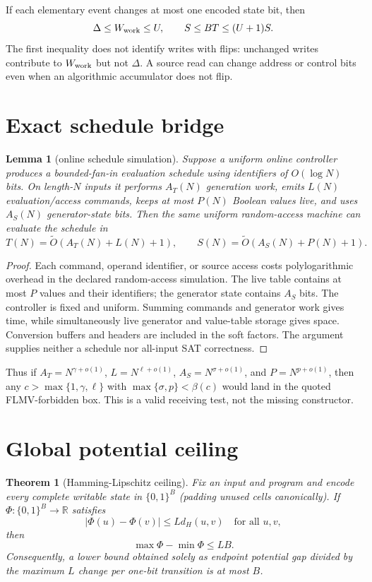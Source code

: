 \documentclass[11pt]{article}
\newtheorem{theorem}{Theorem}
\newtheorem{lemma}{Lemma}
\newcommand{\bits}{\{0,1\}}
\begin{document}
If each elementary event changes at most one encoded state bit, then
\[
 \Delta\le W_{\rm work}\le U,
 \qquad S\le BT\le(U+1)S.
\]
The first inequality does not identify writes with flips: unchanged writes contribute to $W_{\rm work}$ but not $\Delta$.  A source read can change address or control bits even when an algorithmic accumulator does not flip.

\section{Exact schedule bridge}

\begin{lemma}[online schedule simulation]
Suppose a uniform online controller produces a bounded-fan-in evaluation schedule using identifiers of $O(\log N)$ bits.  On length-$N$ inputs it performs $A_T(N)$ generation work, emits $L(N)$ evaluation/access commands, keeps at most $P(N)$ Boolean values live, and uses $A_S(N)$ generator-state bits.  Then the same uniform random-access machine can evaluate the schedule in
\[
 T(N)=\widetilde O(A_T(N)+L(N)+1),\qquad
 S(N)=\widetilde O(A_S(N)+P(N)+1).
\]
\end{lemma}

\begin{proof}
Each command, operand identifier, or source access costs polylogarithmic overhead in the declared random-access simulation.  The live table contains at most $P$ values and their identifiers; the generator state contains $A_S$ bits.  The controller is fixed and uniform.  Summing commands and generator work gives time, while simultaneously live generator and value-table storage gives space.  Conversion buffers and headers are included in the soft factors.  The argument supplies neither a schedule nor all-input SAT correctness.
\end{proof}

Thus if $A_T=N^{\gamma+o(1)}$, $L=N^{\ell+o(1)}$, $A_S=N^{\sigma+o(1)}$, and $P=N^{p+o(1)}$, then any $c>\max\{1,\gamma,\ell\}$ with $\max\{\sigma,p\}<\beta(c)$ would land in the quoted FLMV-forbidden box.  This is a valid receiving test, not the missing constructor.

\section{Global potential ceiling}

\begin{theorem}[Hamming-Lipschitz ceiling]
Fix an input and program and encode every complete writable state in $\bits^B$ (padding unused cells canonically).  If $\Phi:\bits^B\to\mathbb R$ satisfies
\[
 |\Phi(u)-\Phi(v)|\le Ld_H(u,v)
 \quad\text{for all }u,v,
\]
then
\[
 \max\Phi-\min\Phi\le LB.
\]
Consequently, a lower bound obtained solely as endpoint potential gap divided by the maximum $L$ change per one-bit transition is at most $B$.
\end{theorem}
\end{document}
